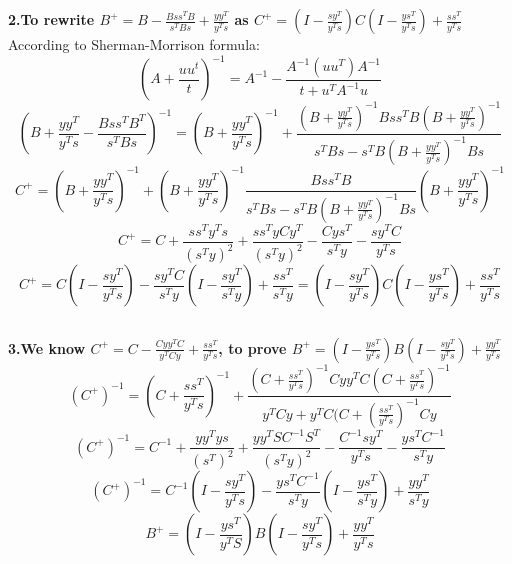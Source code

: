 \documentclass[UTF8]{ctexart}
\begin{document}
\subsection{}
\textbf{2.To rewrite $B^{+}=B-\frac{Bss^{T}B}{s^{T}Bs}+\frac{yy^{T}}{y^{T}s}$ as $C^{+}=(I-\frac{sy^{T}}{y^{T}s})C(I-\frac{ys^{T}}{y^{T}s})+\frac{ss^{T}}{y^{T}s}$}
According to Sherman-Morrison formula:
$$(A+\frac{uu^{t}}{t})^{-1}=A^{-1}-\frac{A^{-1}(uu^{T})A^{-1}}{t+u^{T}A^{-1}u}$$
$$(B+\frac{yy^{T}}{y^{T}s}-\frac{Bss^{T}B^{T}}{s^{T}Bs})^{-1}=(B+\frac{yy^{T}}{y^{T}s})^{-1}+\frac{(B+\frac{yy^{T}}{y^{T}s})^{-1}Bss^{T}B(B+\frac{yy^{T}}{y^{T}s})^{-1}}{s^{T}Bs-s^{T}B(B+\frac{yy^{T}}{y^{T}s})^{-1}Bs}$$
$$C^{+}=(B+\frac{yy^{T}}{y^{T}s})^{-1}+(B+\frac{yy^{T}}{y^{T}s})^{-1}\frac{Bss^{T}B}{s^{T}Bs-s^{T}B(B+\frac{yy^{T}}{y^{T}s})^{-1}Bs}(B+\frac{yy^{T}}{y^{T}s})^{-1}$$
$$C^{+}=C+\frac{ss^{T}y^{T}s}{(s^{T}y)^{2}}+\frac{ss^{T}yCy^{T}}{(s^{T}y)^{2}}-\frac{Cys^{T}}{s^{T}y}-\frac{sy^{T}C}{y^{T}s}$$
$$C^{+}=C(I-\frac{sy^{T}}{y^{T}s})-\frac{sy^{T}C}{s^{T}y}(I-\frac{sy^{T}}{s^{T}y})+\frac{ss^{T}}{s^{T}y}=(I-\frac{sy^{T}}{y^{T}s})C(I-\frac{ys^{T}}{y^{T}s})+\frac{ss^{T}}{y^{T}s}$$


\subsection{}
\textbf{3.We know $C^{+}=C-\frac{Cyy^{T}C}{y^{T}Cy}+\frac{ss^{T}}{y^{T}s}$, to prove $B^{+}=(I-\frac{ys^{T}}{y^{T}s})B(I-\frac{sy^{T}}{y^{T}s})+\frac{yy^{T}}{y^{T}s}$}\\
$$(C^{+})^{-1}=(C+\frac{ss^{T}}{y^{T}s})^{-1}+\frac{(C+\frac{ss^{T}}{y^{T}s})^{-1}Cyy^{T}C(C+\frac{ss^{T}}{y^{T}s})^{-1}}{y^{T}Cy+y^{T}C(C+(\frac{ss^{T}}{y^{T}s})^{-1}Cy}$$
$$(C^{+})^{-1}=C^{-1}+\frac{yy^{T}ys}{(s^{T})^{2}}+\frac{yy^{T}SC^{-1}S^{T}}{(s^{T}y)^{2}}-\frac{C^{-1}sy^{T}}{y^{T}s}-\frac{ys^{T}C^{-1}}{s^{T}y}$$
$$(C^{+})^{-1}=C^{-1}(I-\frac{sy^{T}}{y^{T}s})-\frac{ys^{T}C^{-1}}{s^{T}y}(I-\frac{ys^{T}}{s^{T}y})+\frac{yy^{T}}{s^{T}y}$$
$$B^{+}=(I-\frac{ys^{T}}{y^{T}S})B(I-\frac{sy^{T}}{y^{T}s})+\frac{yy^{T}}{y^{T}s}$$
\end{document}
